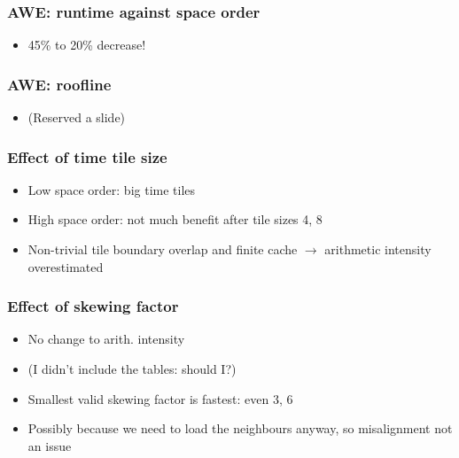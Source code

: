 \documentclass{beamer}
\begin{document}
\begin{frame}
\frametitle{AWE: runtime against space order}

\begin{center}
\end{center}
\begin{itemize}
\item 45\% to 20\% decrease!
\end{itemize}
\end{frame}



\begin{frame}
\frametitle{AWE: roofline}

\begin{itemize}
\item (Reserved a slide)
\end{itemize}
\end{frame}



\begin{frame}
\frametitle{Effect of time tile size}

\begin{itemize}
	\item Low space order: big time tiles
	\item High space order: not much benefit after tile sizes 4, 8
	\item Non-trivial tile boundary overlap and finite cache \(\rightarrow\) arithmetic intensity overestimated
\end{itemize}
\end{frame}



\begin{frame}
\frametitle{Effect of skewing factor}

\begin{itemize}
	\item No change to arith. intensity
	\item (I didn't include the tables: should I?)
	\item Smallest valid skewing factor is fastest: even 3, 6
	\item Possibly because we need to load the neighbours anyway, so misalignment not an issue
\end{itemize}
\end{frame}
\end{document}
